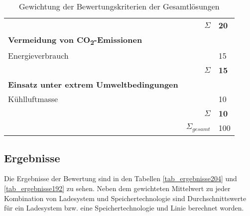 \begin{table}
\begin{tabularx}{\linewidth}{Xrl}
		                                                         &          $\Sigma$ & \textbf{20}     \\
		\textbf{Vermeidung von CO\textsubscript{2}-Emissionen}   &                   &  \\
		Energieverbrauch                                         &                   & 15              \\ \midrule
		                                                         &          $\Sigma$ & \textbf{15}     \\
		\textbf{Einsatz unter extrem Umweltbedingungen}          &                   &  \\
		Kühlluftmasse                                            &                   & 10              \\ \midrule
		                                                         &          $\Sigma$ & \textbf{10}     \\ \midrule
		                                                         & $\Sigma_{gesamt}$ & 100 \\ \bottomrule
	\end{tabularx}
	\caption{Gewichtung der Bewertungskriterien der Gesamtlösungen}
	\label{tab_bewertungskriterien}
\end{table} 

\subsection{Ergebnisse}
Die Ergebnisse der Bewertung sind in den Tabellen \ref{tab_ergebnisse204} und \ref{tab_ergebnisse192} zu sehen. Neben dem gewichteten Mittelwert zu jeder Kombination von Ladesystem und Speichertechnologie sind Durchschnittswerte für ein Ladesystem bzw. eine Speichertechnologie und Linie berechnet worden.

